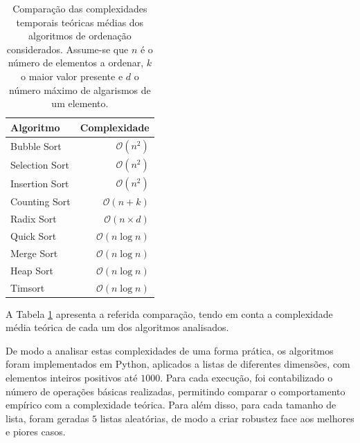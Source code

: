 \documentclass[conference]{IEEEtran}
\begin{document}
\begin{table}[H]
\centering
\caption{Comparação das complexidades temporais teóricas médias dos algoritmos de ordenação considerados. Assume-se que \( n \) é o número de elementos a ordenar, \( k \) o maior valor presente e \( d \) o número máximo de algarismos de um elemento.}
\label{tab:complexidades}
\begin{tabular}{lr}
\toprule
\textbf{Algoritmo} & \textbf{Complexidade} \\
\midrule
Bubble Sort & $\mathcal{O}(n^2)$ \\
Selection Sort & $\mathcal{O}(n^2)$ \\
Insertion Sort & $\mathcal{O}(n^2)$ \\
Counting Sort & $\mathcal{O}(n + k)$ \\
Radix Sort & $\mathcal{O}(n \times d)$ \\
Quick Sort & $\mathcal{O}(n \log n)$ \\
Merge Sort & $\mathcal{O}(n \log n)$ \\
Heap Sort & $\mathcal{O}(n \log n)$ \\
Timsort & $\mathcal{O}(n \log n)$ \\
\bottomrule
\end{tabular}
\end{table}

A Tabela \ref{tab:complexidades} apresenta a referida comparação, tendo em conta a complexidade média teórica de cada um dos algoritmos analisados.

De modo a analisar estas complexidades de uma forma prática, os algoritmos foram implementados em Python, aplicados a listas de diferentes dimensões, com elementos inteiros positivos até $1000$. Para cada execução, foi contabilizado o número de operações básicas realizadas, permitindo comparar o comportamento empírico com a complexidade teórica. Para além disso, para cada tamanho de lista, foram geradas $5$ listas aleatórias, de modo a criar robustez face aos melhores e piores casos.
\end{document}
